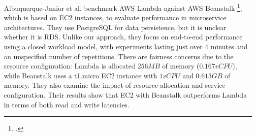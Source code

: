 Albuquerque-Junior et al. \cite{paper_albu_lambdaec2} benchmark AWS Lambda against AWS Beanstalk \footcite{https://aws.amazon.com/elasticbeanstalk/}, which is based on EC2 instances, to evaluate performance in microservice architectures. They use PostgreSQL for data persistence, but it is unclear whether it is RDS. Unlike our approach, they focus on end-to-end performance using a closed workload model, with experiments lasting just over 4 minutes and an unspecified number of repetitions. There are fairness concerns due to the resource configuration: Lambda is allocated $256MB$ of memory ($0.167vCPU$), while Beanstalk uses a t1.micro EC2 instance with $1vCPU$ and $0.613GB$ of memory. They also examine the impact of resource allocation and service configuration. Their results show that EC2 with Beanstalk outperforms Lambda in terms of both read and write latencies.
